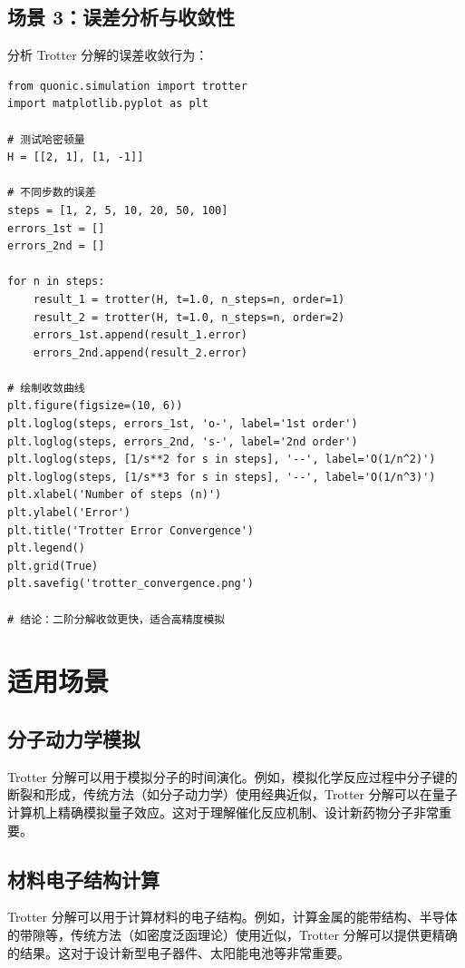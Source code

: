 \documentclass[12pt,a4paper]{article}
\begin{document}
\subsection{场景 3：误差分析与收敛性}

分析 Trotter 分解的误差收敛行为：

\begin{verbatim}
from quonic.simulation import trotter
import matplotlib.pyplot as plt

# 测试哈密顿量
H = [[2, 1], [1, -1]]

# 不同步数的误差
steps = [1, 2, 5, 10, 20, 50, 100]
errors_1st = []
errors_2nd = []

for n in steps:
    result_1 = trotter(H, t=1.0, n_steps=n, order=1)
    result_2 = trotter(H, t=1.0, n_steps=n, order=2)
    errors_1st.append(result_1.error)
    errors_2nd.append(result_2.error)

# 绘制收敛曲线
plt.figure(figsize=(10, 6))
plt.loglog(steps, errors_1st, 'o-', label='1st order')
plt.loglog(steps, errors_2nd, 's-', label='2nd order')
plt.loglog(steps, [1/s**2 for s in steps], '--', label='O(1/n^2)')
plt.loglog(steps, [1/s**3 for s in steps], '--', label='O(1/n^3)')
plt.xlabel('Number of steps (n)')
plt.ylabel('Error')
plt.title('Trotter Error Convergence')
plt.legend()
plt.grid(True)
plt.savefig('trotter_convergence.png')

# 结论：二阶分解收敛更快，适合高精度模拟
\end{verbatim}

\section{适用场景}

\subsection{分子动力学模拟}

Trotter 分解可以用于模拟分子的时间演化。例如，模拟化学反应过程中分子键的断裂和形成，传统方法（如分子动力学）使用经典近似，Trotter 分解可以在量子计算机上精确模拟量子效应。这对于理解催化反应机制、设计新药物分子非常重要。

\subsection{材料电子结构计算}

Trotter 分解可以用于计算材料的电子结构。例如，计算金属的能带结构、半导体的带隙等，传统方法（如密度泛函理论）使用近似，Trotter 分解可以提供更精确的结果。这对于设计新型电子器件、太阳能电池等非常重要。
\end{document}
